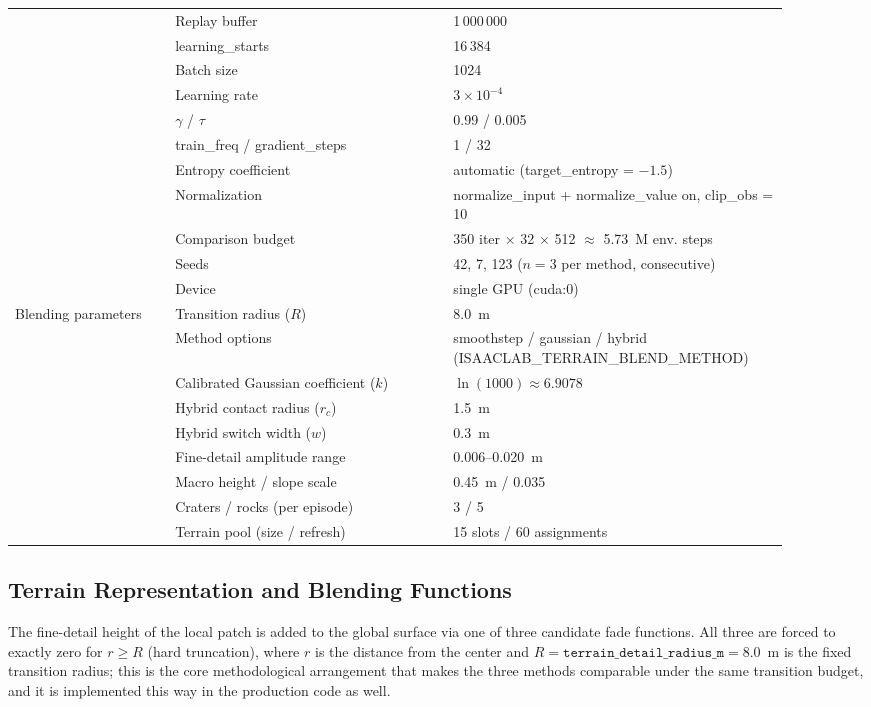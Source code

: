 \begin{table}[t]
\begin{tabular}{@{}p{0.19\linewidth}p{0.33\linewidth}p{0.38\linewidth}@{}}
 & Replay buffer & 1\,000\,000 \\
 & learning\_starts & 16\,384 \\
 & Batch size & 1024 \\
 & Learning rate & $3\times10^{-4}$ \\
 & $\gamma$ / $\tau$ & 0.99 / 0.005 \\
 & train\_freq / gradient\_steps & 1 / 32 \\
 & Entropy coefficient & automatic (target\_entropy = $-1.5$) \\
 & Normalization & normalize\_input + normalize\_value on, clip\_obs = 10 \\
 & Comparison budget & 350 iter $\times$ 32 $\times$ 512 $\approx$ 5.73~M env. steps \\
 & Seeds & 42, 7, 123 ($n=3$ per method, consecutive) \\
 & Device & single GPU (cuda:0) \\
\midrule
\multirow{9}{*}{Blending parameters}
 & Transition radius ($R$) & 8.0~m \\
 & Method options & smoothstep / gaussian / hybrid (ISAACLAB\_TERRAIN\_BLEND\_METHOD) \\
 & Calibrated Gaussian coefficient ($k$) & $\ln(1000)\approx 6.9078$ \\
 & Hybrid contact radius ($r_c$) & 1.5~m \\
 & Hybrid switch width ($w$) & 0.3~m \\
 & Fine-detail amplitude range & 0.006--0.020~m \\
 & Macro height / slope scale & 0.45~m / 0.035 \\
 & Craters / rocks (per episode) & 3 / 5 \\
 & Terrain pool (size / refresh) & 15 slots / 60 assignments \\
\bottomrule
\end{tabular}
\end{table}

\subsection{Terrain Representation and Blending Functions}
\label{sec:blend}

The fine-detail height of the local patch is added to the global surface
via one of three candidate fade functions. All three are forced to
exactly zero for $r\ge R$ (hard truncation), where $r$ is the distance
from the center and $R=\texttt{terrain\_detail\_radius\_m}=8.0$~m is the
fixed transition radius; this is the core methodological arrangement
that makes the three methods comparable under the same transition
budget, and it is implemented this way in the production code as well.

